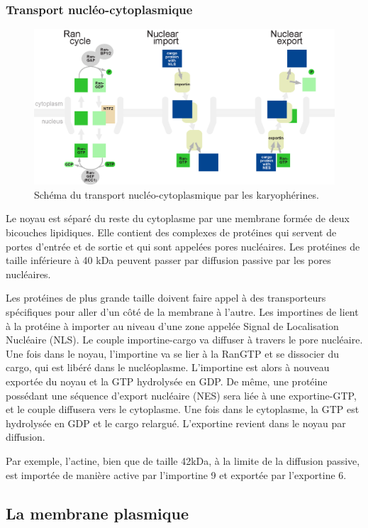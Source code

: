 \subsubsection{Transport nucléo-cytoplasmique}
\begin{figure}
\includegraphics[scale=0.8]{Rancycle_nuclearimport_nuclearexport.png}
\caption{Schéma du transport nucléo-cytoplasmique par les karyophérines.}
\end{figure}
Le noyau est séparé du reste du cytoplasme par une membrane formée de deux bicouches lipidiques. Elle contient des complexes de protéines qui servent de portes d'entrée et de sortie  et qui sont appelées pores nucléaires. Les protéines de taille inférieure à 40 kDa peuvent passer par diffusion passive par les pores nucléaires. 

Les protéines de plus grande taille doivent faire appel à des transporteurs spécifiques pour aller d'un côté de la membrane à l'autre. 
Les importines de lient à la protéine à importer au niveau d'une zone appelée \og Signal de Localisation Nucléaire \fg (NLS). Le couple importine-cargo va diffuser à travers le pore nucléaire. 
Une fois dans le noyau, l'importine va se lier à la RanGTP et se dissocier du cargo, qui est libéré dans le nucléoplasme. L'importine est alors à nouveau exportée du noyau et la GTP hydrolysée en GDP. 
De même, une protéine possédant une séquence d'export nucléaire (NES) sera liée à une exportine-GTP, et le couple diffusera vers le cytoplasme. Une fois dans le cytoplasme, la GTP est hydrolysée en GDP et le cargo relargué. L'exportine revient dans le noyau par diffusion. 

Par exemple, l'actine, bien que de taille 42kDa, à la limite de la diffusion passive, est importée de manière active par l'importine 9 et exportée par l'exportine 6. 

\subsection{La membrane plasmique}

